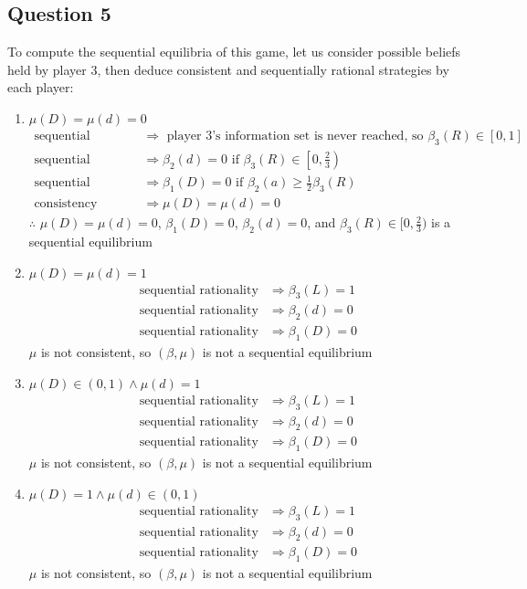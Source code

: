 \documentclass{article}
\begin{document}
\subsection*{Question 5}
To compute the sequential equilibria of this game, let us consider possible beliefs held by player 3, then deduce consistent and sequentially rational strategies by each player:
\begin{enumerate}
	\item $\mu(D) = \mu(d) = 0$
		\begin{align*}
			\text{sequential rationality} 	&\Rightarrow \text{ player 3's information set is never reached, so }\beta_3(R)\in[0,1] \\
			\text{sequential rationality} 	&\Rightarrow \beta_2(d) = 0	\text{ if }\beta_3(R)\in\left[0,\frac{2}{3}\right)\\
			\text{sequential rationality} 	&\Rightarrow \beta_1(D) = 0 \text{ if }\beta_2(a)\geq\frac{1}{2}\beta_3(R)	\\
			\text{consistency}				&\Rightarrow \mu(D) = \mu(d) = 0	
		\end{align*}
		$\therefore$ ${\mu(D) = \mu(d) = 0}$, ${\beta_1(D)=0}$, ${\beta_2(d)=0}$, and ${\beta_3(R)\in[0,\frac{2}{3})}$ is a sequential equilibrium 
		
	\item $\mu(D) = \mu(d) = 1$
		\begin{align*}
			\text{sequential rationality} 	&\Rightarrow \beta_3(L) = 1	\\
			\text{sequential rationality} 	&\Rightarrow \beta_2(d) = 0	\\
			\text{sequential rationality} 	&\Rightarrow \beta_1(D) = 0	
		\end{align*}
		$\mu$ is not consistent, so $(\beta,\mu)$ is not a sequential equilibrium
		
	\item $\mu(D)\in(0,1)\land \mu(d) = 1$
		\begin{align*}
			\text{sequential rationality} 	&\Rightarrow \beta_3(L) = 1	\\
			\text{sequential rationality} 	&\Rightarrow \beta_2(d) = 0	\\
			\text{sequential rationality} 	&\Rightarrow \beta_1(D) = 0	
		\end{align*}
		$\mu$ is not consistent, so $(\beta,\mu)$ is not a sequential equilibrium
		
	\item $\mu(D) = 1\land \mu(d)\in(0,1)$
		\begin{align*}
			\text{sequential rationality} 	&\Rightarrow \beta_3(L) = 1	\\
			\text{sequential rationality} 	&\Rightarrow \beta_2(d) = 0	\\
			\text{sequential rationality} 	&\Rightarrow \beta_1(D) = 0	
		\end{align*}
		$\mu$ is not consistent, so $(\beta,\mu)$ is not a sequential equilibrium
		

\end{enumerate}
\end{document}
